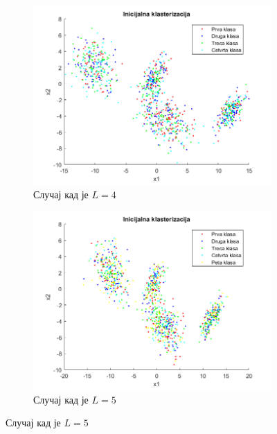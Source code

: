 \begin{figure}[htb!]
\begin{subfigure}{.55\textwidth}
\end{subfigure}
\bigskip
\begin{subfigure}{.55\textwidth}
\centering
\includegraphics[width=1\linewidth]{pictures/4/Quad4Init}
\caption{Случај кад је $L=4$}\label{pic:Quad4Init}
\end{subfigure}
\begin{subfigure}{.55\textwidth}
\centering
\includegraphics[width=1\linewidth]{pictures/4/Quad5Init}
\caption{Случај кад је $L=5$}\label{pic:Quad5Init}
\end{subfigure}
\end{figure}

